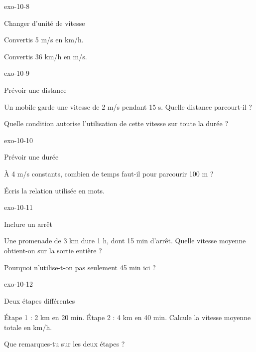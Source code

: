 \documentclass[12pt,twoside,openany]{book}
\begin{document}
\begin{blocLivre}{exo-10-8}
\begin{exercice}[2]{Changer d’unité de vitesse}
\begin{questions}
\item Convertis 5 m/s en km/h.
\item Convertis 36 km/h en m/s.
\end{questions}
\end{exercice}\end{blocLivre}
\begin{blocLivre}{exo-10-9}
\begin{exercice}[2]{Prévoir une distance}
\begin{questions}
\item Un mobile garde une vitesse de 2 m/s pendant 15 s. Quelle distance parcourt-il ?
\item Quelle condition autorise l’utilisation de cette vitesse sur toute la durée ?
\end{questions}
\end{exercice}\end{blocLivre}
\begin{blocLivre}{exo-10-10}
\begin{exercice}[2]{Prévoir une durée}
\begin{questions}
\item À 4 m/s constants, combien de temps faut-il pour parcourir 100 m ?
\item Écris la relation utilisée en mots.
\end{questions}
\end{exercice}\end{blocLivre}
\begin{blocLivre}{exo-10-11}
\begin{exercice}[2]{Inclure un arrêt}
\begin{questions}
\item Une promenade de 3 km dure 1 h, dont 15 min d’arrêt. Quelle vitesse moyenne obtient-on sur la sortie entière ?
\item Pourquoi n’utilise-t-on pas seulement 45 min ici ?
\end{questions}
\end{exercice}\end{blocLivre}
\begin{blocLivre}{exo-10-12}
\begin{exercice}[3]{Deux étapes différentes}
\begin{questions}
\item Étape 1 : 2 km en 20 min. Étape 2 : 4 km en 40 min. Calcule la vitesse moyenne totale en km/h.
\item Que remarques-tu sur les deux étapes ?
\end{questions}
\end{exercice}\end{blocLivre}
\end{document}
